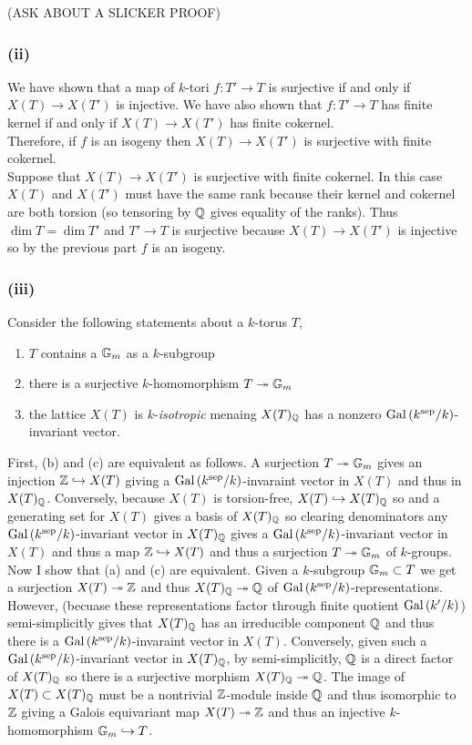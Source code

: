 \documentclass[12pt]{article}
\begin{document}
(ASK ABOUT A SLICKER PROOF)

\subsubsection{(ii)}

We have shown that a map of $k$-tori $f : T' \to T$ is surjective if and only if $X(T) \to X(T')$ is injective. We have also shown that $f : T' \to T$ has finite kernel if and only if $X(T) \to X(T')$ has finite cokernel.
\bigskip\\
Therefore, if $f$ is an isogeny then $X(T) \to X(T')$ is surjective with finite cokernel.
\bigskip\\
Suppose that $X(T) \to X(T')$ is surjective with finite cokernel. In this case $X(T)$ and $X(T')$ must have the same rank because their kernel and cokernel are both torsion (so tensoring by $\mathbb{Q}$ gives equality of the ranks). Thus $\dim{T} = \dim{T'}$ and $T' \to T$ is surjective because $X(T) \to X(T')$ is injective so by the previous part $f$ is an isogeny. 

\subsubsection{(iii)}

Consider the following statements about a $k$-torus $T$,
\begin{enumerate}
\item $T$ contains a $\mathbb{G}_m$ as a $k$-subgroup
\item there is a surjective $k$-homomorphism $T \twoheadrightarrow \mathbb{G}_m$
\item the lattice $X(T)$ is $k$-\textit{isotropic} menaing $X(T)_{\mathbb{Q}}$ has a nonzero $\mathrm{Gal}\left( k^{\mathrm{sep}}/k \right)$-invariant vector.
\end{enumerate}

First, (b) and (c) are equivalent as follows. A surjection $T \twoheadrightarrow \mathbb{G}_m$ gives an injection $\mathbb{Z} \hookrightarrow X(T)$ giving a $\mathrm{Gal}\left( k^{\mathrm{sep}}/k \right)$-invaraint vector in $X(T)$ and thus in $X(T)_{\mathbb{Q}}$. Conversely, because $X(T)$ is torsion-free, $X(T) \hookrightarrow X(T)_{\mathbb{Q}}$ so and a generating set for $X(T)$ gives a basis of $X(T)_{\mathbb{Q}}$ so clearing denominators any $\mathrm{Gal}\left( k^{\mathrm{sep}}/k \right)$-invariant vector in $X(T)_{\mathbb{Q}}$ gives a $\mathrm{Gal}\left( k^{\mathrm{sep}}/k \right)$-invariant vector in $X(T)$ and thus a map $\mathbb{Z} \hookrightarrow X(T)$ and thus a surjection $T \twoheadrightarrow \mathbb{G}_m$ of $k$-groups.
\bigskip\\
Now I show that (a) and (c) are equivalent. Given a $k$-subgroup $\mathbb{G}_m \subset T$ we get a surjection $X(T) \twoheadrightarrow \mathbb{Z}$ and thus $X(T)_{\mathbb{Q}} \twoheadrightarrow \mathbb{Q}$ of $\mathrm{Gal}\left( k^{\mathrm{sep}}/k \right)$-representations. However, (becuase these representations factor through finite quotient $\mathrm{Gal}\left( k'/k \right)$) semi-simplicitly gives that $X(T)_{\mathbb{Q}}$ has an irreducible component $\mathbb{Q}$ and thus there is a $\mathrm{Gal}\left( k^{\mathrm{sep}}/k \right)$-invaraint vector in $X(T)$. Conversely, given such a $\mathrm{Gal}\left( k^{\mathrm{sep}}/k \right)$-invariant vector in $X(T)_{\mathbb{Q}}$, by semi-simplicitly, $\mathbb{Q}$ is a direct factor of $X(T)_{\mathbb{Q}}$ so there is a surjective morphism $X(T)_{\mathbb{Q}} \twoheadrightarrow \mathbb{Q}$. The image of $X(T) \subset X(T)_{\mathbb{Q}}$ must be a nontrivial $\mathbb{Z}$-module inside $\mathbb{Q}$ and thus isomorphic to $\mathbb{Z}$ giving a Galois equivariant map $X(T) \twoheadrightarrow \mathbb{Z}$ and thus an injective $k$-homomorphism $\mathbb{G}_m \hookrightarrow T$.
\end{document}
